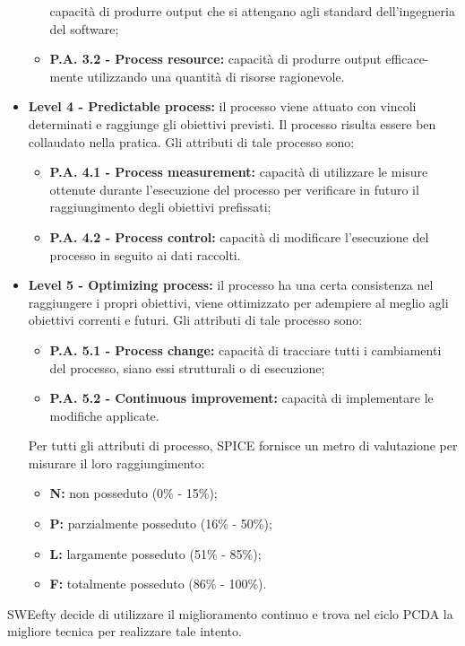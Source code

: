\begin{itemize}
\begin{itemize}
			capacità  di  produrre  output  che  si
			attengano agli standard dell’ingegneria del software;
			\item \textbf{P.A. 3.2 - Process resource:}
			capacità  di  produrre  output  efficace-
			mente utilizzando una quantità di risorse ragionevole.
		\end{itemize}
	\item \textbf{Level 4 - Predictable process:}
		il processo viene attuato con vincoli determinati  e  raggiunge  gli  obiettivi  previsti.   Il  processo  risulta  essere ben collaudato nella pratica.  Gli attributi di tale processo sono:
		\begin{itemize}
			\item \textbf{P.A. 4.1 - Process measurement:}
			capacità  di  utilizzare  le  misure ottenute durante l’esecuzione del processo per verificare in futuro il raggiungimento degli obiettivi prefissati;
			\item \textbf{P.A. 4.2 - Process control:}
			capacità  di  modificare  l’esecuzione  del processo in seguito ai dati raccolti.
		\end{itemize}
	\item \textbf{Level 5 - Optimizing process:}
		il  processo  ha  una  certa  consistenza nel raggiungere i propri obiettivi, viene ottimizzato per adempiere al meglio	agli obiettivi correnti e futuri.  
		Gli attributi di tale processo sono:
		\begin{itemize}
			\item \textbf{P.A. 5.1 - Process change:}
			capacità di tracciare tutti i cambiamenti del processo, siano essi strutturali o di esecuzione;
			\item \textbf{P.A. 5.2 - Continuous improvement:}
			capacità di implementare le modifiche applicate.
		\end{itemize}

		Per tutti gli attributi di processo, SPICE fornisce un metro di valutazione per misurare il loro raggiungimento:
		\begin{itemize}
			\item \textbf{N:} non posseduto (0\% - 15\%);
			\item \textbf{P:} parzialmente posseduto (16\% - 50\%);
			\item \textbf{L:} largamente posseduto (51\% - 85\%);
			\item \textbf{F:} totalmente posseduto (86\% - 100\%).
		\end{itemize}
\end{itemize}
	SWEefty decide di utilizzare il miglioramento continuo e trova nel ciclo PCDA la migliore tecnica per realizzare tale intento.
